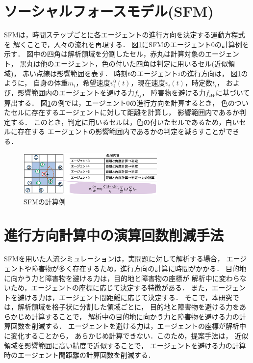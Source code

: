 \documentclass{maelab_y}
\newcommand{\分類条件}{
\begin{table}[t]
\begin{center}
\caption{進行方向を分類する条件}
\ecaption{Classification condition of moving direction $e_{i}$.}
\label{tb:hantei_jouken}
\begin{tabular}{c|c|c|c|c}
\hline \hline
			& 右 & 左 & 上 & 下 \\ \hline
パターン2   & $\frac{1}{\sqrt{2}} < e_x \leq 1  $
		    & $ -1 \leq e_x < \frac{-1}{\sqrt{2}}$ 
		    & $ \frac{-1}{\sqrt{2}} < e_x < \frac{1}{\sqrt{2}} $ 
		    & $ \frac{-1}{2} < e_x < \frac{1}{2} $ \\
パターン3   & $\frac{-1}{2} < e_y < \frac{1}{2} $ 
		    & $\frac{-1}{2} < e_y < \frac{1}{2} $
            & $ \frac{1}{\sqrt{2}} < e_y \leq 1$
		    & $ -1 \leq e_y < \frac{-1}{\sqrt{2}} $ \\
\hline
\multirow{2}{*}{パターン4}   
			& $R_x \geq A_x$ & $R_x < A_x$ & $R_y \geq A_y$ & $R_y < A_y $ \\
	        &  $L_x \geq A_x$ & $L_x < A_x$ & $L_y \geq A_y$ & $L_y < A_y$ \\
\hline
\multirow{2}{*}{パターン5}   
 			& $R_x \geq x_1$ & $R_x < x_2$ & $R_y \geq y_1$ & $R_y < y_2 $ \\
			& $L_x \geq x_1$ & $L_x < x_2$ & $L_y \geq y_1$ & $L_y < y_2 $ \\
\hline
パターン6   & $ \cos(\frac{1}{2}\theta_{view}) \leq  e_y $ 
			& $ e_y \leq -\cos(\frac{1}{2}\theta_{view})$ 
			& $ \sin(\frac{1}{2}(\pi - \theta_{view})) \leq e_x $ 
			& $ e_x \leq \sin(\frac{1}{2}(\pi - \theta_{view}))  $ \\
\hline
\end{tabular}
\end{center}
\end{table}}
\newcommand{\距離計算new}{
  \begin{table}[]
    \caption{エージェント間距離の計算回数[$10^{10}$回]}
    \label{tab:my-table}
    \begin{tabular}{c|llllll}
    \hline
    \multirow{2}{*}{人数}   & \multicolumn{6}{c}{パターン}                                                                                                                                                              \\ \cline{2-7} 
                          & \multicolumn{1}{c|}{1}    & \multicolumn{1}{c|}{2}               & \multicolumn{1}{c|}{3}      & \multicolumn{1}{c|}{4}      & \multicolumn{1}{c|}{5}      & \multicolumn{1}{c}{6}    \\ \hline
    \multirow{2}{*}{3000} & \multicolumn{1}{r|}{5.1}  & \multicolumn{1}{r|}{\textbf{3.9}}    & \multicolumn{1}{r|}{4.0}    & \multicolumn{1}{r|}{4.4}    & \multicolumn{1}{r|}{4.1}    & \multicolumn{1}{r}{4.4}  \\
                          & \multicolumn{1}{l|}{}     & \multicolumn{1}{l|}{\textbf{(24\%)}} & \multicolumn{1}{l|}{(23\%)} & \multicolumn{1}{l|}{(15\%)} & \multicolumn{1}{l|}{(21\%)} & (15\%)                   \\ \hline
    \multirow{2}{*}{5000} & \multicolumn{1}{r|}{14.4} & \multicolumn{1}{r|}{\textbf{10.9}}   & \multicolumn{1}{r|}{11.1}   & \multicolumn{1}{r|}{12.2}   & \multicolumn{1}{r|}{11.4}   & \multicolumn{1}{r}{12.2} \\
                          & \multicolumn{1}{l|}{}     & \multicolumn{1}{l|}{\textbf{(24\%)}} & \multicolumn{1}{l|}{(23\%)} & \multicolumn{1}{l|}{(15\%)} & \multicolumn{1}{l|}{(21\%)} & (15\%)                   \\ \hline
    \multirow{2}{*}{7500} & \multicolumn{1}{r|}{33.1} & \multicolumn{1}{r|}{\textbf{25.2}}   & \multicolumn{1}{r|}{25.8}   & \multicolumn{1}{r|}{28.3}   & \multicolumn{1}{r|}{26.7}   & \multicolumn{1}{r}{28.3} \\
                          & \multicolumn{1}{l|}{}     & \multicolumn{1}{l|}{\textbf{(24\%)}} & \multicolumn{1}{l|}{(22\%)} & \multicolumn{1}{l|}{(15\%)} & \multicolumn{1}{l|}{(20\%)} & (15\%)                   \\ \hline
    \end{tabular}
    \end{table}
}
\newcommand{\距離計算回数}{
\begin{table}[hbtp]
\begin{center}
\caption{エージェント間距離の計算回数[$10^{10}$回]}
\label{tb:count_result_yobi}
\begin{tabular}{c|r|r|r|r|r|r}
\hline \hline
	人数 & 1 & 2 & 3 & 4 & 5 & 6 \\  
	\hline
	\multirow{2}{*}{3000} 
	& 5.1   & $\mathbf{3.9}$   & 4.0    & 4.4    & 4.1    & 4.4   \\  
	&       & ($\mathbf{24.5}$\%) 					& (22.9\%) & (15.3\%) & (20.7\%) & (15.2\%) \\ \hline
	\multirow{2}{*}{5000} 
	& 14.4  &  $\mathbf{10.9}$  					  & 11.1   & 12.2   & 11.4   & 12.2  \\  
	&       & ($\mathbf{23.8}$\%) 					& (22.6\%) & (15.2\%) & (20.5\%) & (15.1\%) \\ \hline
	\multirow{2}{*}{7500} 
	& 33.1  & $\mathbf{25.2}$	 		    	 	 & 25.8   & 28.3   & 26.7   & 28.3  \\ 
	&       & ($\mathbf{23.9}$\%) 					& (22.2\%) & (14.6\%) & (19.4\%) & (14.6\%) \\ \hline
    \end{tabular}
  \end{center}
\end{table}}
\begin{document}
\section{ソーシャルフォースモデル(SFM)}
SFMは，時間ステップごとに各エージェントの進行方向を決定する運動方程式を
解くことで，人々の流れを再現する．
図\ref{fig:sfm_ex}にSFMのエージェント0の計算例を示す．
図中の四角は解析領域を分割したセル，赤丸は計算対象のエージェント，
黒丸は他のエージェント，色の付いた四角は判定に用いるセル(近似領域)，
赤い点線は影響範囲を表す．
時刻$t$のエージェント$i$の進行方向は，
図\ref{fig:sfm_ex}のように，
自身の体重$m_i$，希望速度$v_i^0(t)$，現在速度$v_i(t)$，時定数$t_i$，
および，影響範囲内のエージェントを避ける力$f_{ij}$，
障害物を避ける力$f_{iW}$に基づいて算出する．
図\ref{fig:sfm_ex}の例では，エージェント0の進行方向を計算するとき，
色のついたセルに存在するエージェントに対して距離を計算し，
影響範囲内であるか判定する．
このとき，判定に用いるセルは，色の付いたセルであるため，白いセルに存在する
エージェントの影響範囲内であるかの判定を減らすことができる．

\begin{figure}[hbtp]
 \begin{center}
  \includegraphics[width=7.21cm,clip]{figure/sfm_ex.eps}
  \caption{SFMの計算例}
  \label{fig:sfm_ex}
 \end{center}
\end{figure}

\section{進行方向計算中の演算回数削減手法}
SFMを用いた人流シミュレーションは，実問題に対して解析する場合，
エージェントや障害物が多く存在するため，進行方向の計算に時間がかかる．
目的地に向かう力と障害物を避ける力は，目的地と障害物の座標が
解析中に変わらないため，エージェントの座標に応じて決定する特徴がある．
また，エージェントを避ける力は，エージェント間距離に応じて決定する．
そこで，本研究では，解析領域を格子状に分割した領域ごとに，
目的地と障害物を避ける力をあらかじめ計算することで，
解析中の目的地に向かう力と障害物を避ける力の計算回数を削減する．
エージェントを避ける力は，エージェントの座標が解析中に変化することから，
あらかじめ計算できない．このため，提案手法は，
近似領域を影響範囲に高い精度で近似することで，
エージェントを避ける力の計算時のエージェント間距離の計算回数を削減する．
\end{document}
